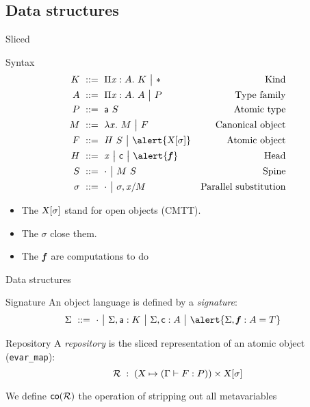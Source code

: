 
\subsection{Data structures}

\begin{frame}{Sliced \LF}
  \begin{block}{Syntax}
  \begin{align*}
    K &\gequal \prd x A K \gor \type &
    \text{Kind}\\
    A &\gequal \prd x A A \gor P &
    \text{Type family} \\
    P &\gequal \app {\cst a} S &
    \text{Atomic type} \\
    M &\gequal \lam x M \gor F &
    \text{Canonical object} \\
    F &\gequal \app H S \gor \alert{\smeta X \sigma} &
    \text{Atomic object} \\
    H &\gequal \var x \gor \cst c \gor \alert{\fct{f}} &
    \text{Head}\\
    S &\gequal \spinenil \gor \spinecons M S &
    \text{Spine}\\
    \sigma &\gequal \msubstnil \gor \msubstcons \sigma x M &
    \text{Parallel substitution}
  \end{align*}
  \vspace{-1.5em}
  \begin{itemize}
    \item The ${\text{\textsl{X}}}[{\sigma}]$ stand for open objects (CMTT).
    \item The $\sigma$ close them.
    \item The $\text{\textit{\textbf{f}}}$ are computations to do
  \end{itemize}
  \end{block}
\end{frame}

\begin{frame}[fragile]{Data structures}
  \begin{block}{Signature}
    An object language is defined by a \emph{signature}:
    \begin{align*}
      \Sigma &\gequal \gnil \gor \gcons \Sigma {\cst a : K} \gor \gcons
      \Sigma {\cst c : A} \gor \alert{\gcons \Sigma {\fct f : A = T}}
    \end{align*}
  \end{block}
  \begin{block}{Repository}
    A \emph{repository} is the sliced representation of an atomic object (\verb'evar_map'):
    $$ \mathcal{R}\;:\;(\text{\textsl{X}} \mapsto (\Gamma\vdash{F}:{P}))\times{\ensuremath{\text{\textsl{X}}}}[{\sigma}] $$

    We define ${\text{\textsf{co}}}({\mathcal{R}})$ the operation of stripping out all metavariables
  \end{block}
\end{frame}

